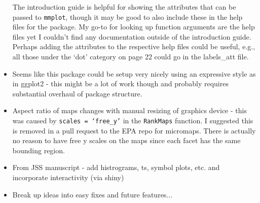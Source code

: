 \documentclass[letterpaper,12pt]{article}\usepackage[]{graphicx}\usepackage[]{color}
\begin{document}
\begin{itemize}
The introduction guide is helpful for showing the attributes that can be passed to \texttt{mmplot}, though it may be good to also include these in the help files for the package.  My go-to for looking up function arguments are the help files yet I couldn't find any documentation outside of the introduction guide.  Perhaps adding the attributes to the respective help files could be useful, e.g., all those under the `dot' category on page 22 could go in the labels\_att file.

\item Seems like this package could be setup very nicely using an expressive style as in ggplot2 - this might be a lot of work though and probably requires substantial overhaul of package structure.   
\item Aspect ratio of maps changes with manual resizing of graphics device - this was caused by \texttt{scales = `free\_y'} in the \texttt{RankMaps} function.  I suggested this is removed in a pull request to the EPA repo for micromaps.  There is actually no reason to have free y scales on the maps since each facet has the same bounding region.
\item From JSS manuscript - add histrograms, ts, symbol plots, etc. and incorporate interactivity (via shiny)
\item Break up ideas into easy fixes and future features...
\end{itemize}
\end{document}

